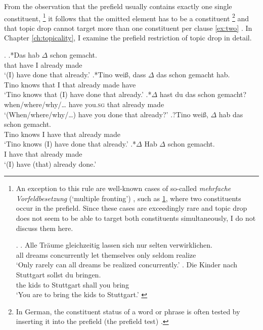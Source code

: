 From the observation that the prefield usually contains exactly one single constituent,%
\footnote{An exception to this rule are well-known cases of so-called \textit{mehrfache Vorfeldbesetzung} (`multiple fronting') \citep{muller2005}, such as \ref{ex:multiple.fronting}, where two constituents occur in the prefield.
Since these cases are exceedingly rare and topic drop does not seem to be able to target both constituents simultaneously, I do not discuss them here.

\ex.\label{ex:multiple.fronting}
\ag. Alle Träume gleichzeitig lassen sich nur selten verwirklichen.\\
all dreams concurrently let themselves only seldom realize\\
`Only rarely can all dreams be realized concurrently.' \citep[299]{mueller2005}
\bg. Die Kinder nach Stuttgart sollst du bringen.\\
the kids to Stuttgart shall you bring\\
`You are to bring the kids to Stuttgart.' \citep[81]{engel1970}

}
it follows that the omitted element has to be a constituent%
\footnote{In German, the constituent status of a word or phrase is often tested by inserting it into the prefield (the prefield test) \citep[33]{pittner.berman2021}.}
%
and that topic drop cannot target more than one constituent per clause \ref{ex:two} \citep{fries1988}.
In Chapter \ref{ch:topicality}, I examine the prefield restriction of topic drop in detail.

\ex.\label{ex:TDlimits}
\ag.*\label{ex:MF}Das hab $\Delta$ schon gemacht.\\
that have I already made\\
`(I) have done that already.'
\bg.*\label{ex:subord}Tino weiß, dass $\Delta$ das schon gemacht hab.\\
Tino knows that I that already made have\\
`Tino knows that (I) have done that already.'
\bg.*\label{ex:q}$\Delta$ hast du das schon gemacht?\\
{when/where/why/\dots} have you.\textsc{sg} that already made\\
`(When/where/why/\dots) have you done that already?'
\bg.?\label{ex:emb}Tino weiß, $\Delta$ hab das schon gemacht.\\
Tino knows I have that already made\\
`Tino knows (I) have done that already.'
\bg.*\label{ex:two}$\Delta$ Hab $\Delta$ schon gemacht.\\
I have that already made\\
`(I) have (that) already done.'


